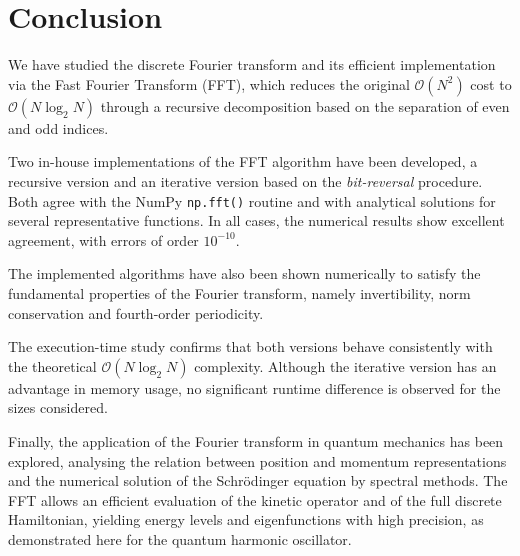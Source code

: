 \documentclass[11pt,a4paper,twoside,pdf]{article}
\numberwithin{equation}{section}
\begin{document}
\newpage
\section{Conclusion}



We have studied the discrete Fourier transform and its efficient implementation via the Fast Fourier Transform (FFT), which reduces the original $\mathcal{O}(N^2)$ cost to $\mathcal{O}(N\log_2 N)$ through a recursive decomposition based on the separation of even and odd indices.

Two in-house implementations of the FFT algorithm have been developed, a recursive version and an iterative version based on the \emph{bit-reversal} procedure. Both agree with the NumPy \texttt{np.fft()} routine and with analytical solutions for several representative functions. In all cases, the numerical results show excellent agreement, with errors of order $10^{-10}$.

The implemented algorithms have also been shown numerically to satisfy the fundamental properties of the Fourier transform, namely invertibility, norm conservation and fourth-order periodicity.

The execution-time study confirms that both versions behave consistently with the theoretical $\mathcal{O}(N\log_2 N)$ complexity. Although the iterative version has an advantage in memory usage, no significant runtime difference is observed for the sizes considered.

Finally, the application of the Fourier transform in quantum mechanics has been explored, analysing the relation between position and momentum representations and the numerical solution of the Schr\"odinger equation by spectral methods. The FFT allows an efficient evaluation of the kinetic operator and of the full discrete Hamiltonian, yielding energy levels and eigenfunctions with high precision, as demonstrated here for the quantum harmonic oscillator.



\newpage


\end{document}
